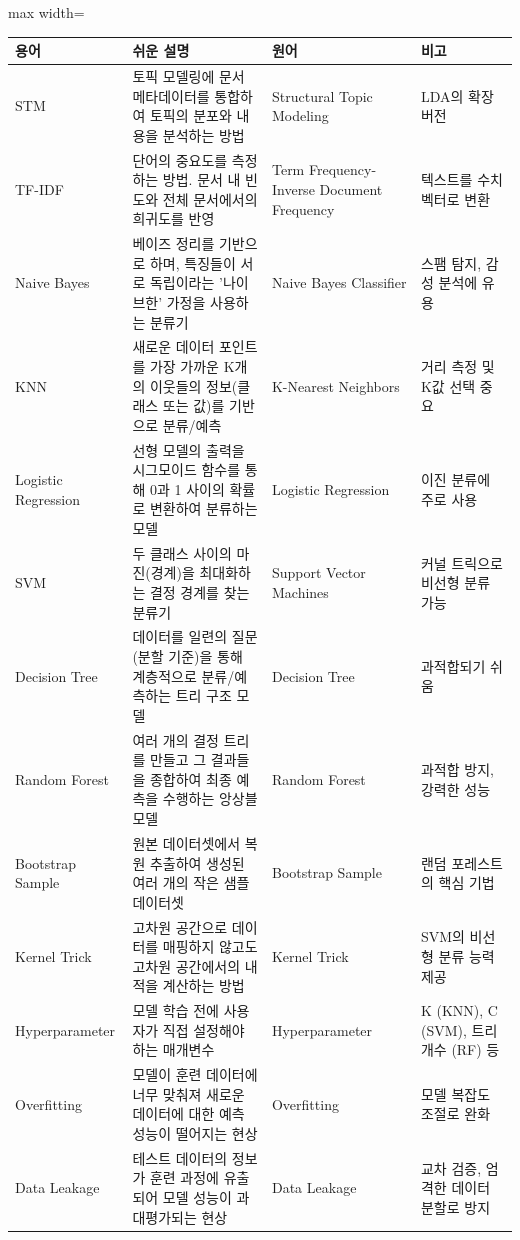 \documentclass[11pt,a4paper]{article}
\begin{document}
\begin{adjustbox}{max width=\textwidth}
\begin{tabular}{llll}
\toprule
\textbf{용어} & \textbf{쉬운 설명} & \textbf{원어} & \textbf{비고} \\
\midrule
STM & 토픽 모델링에 문서 메타데이터를 통합하여 토픽의 분포와 내용을 분석하는 방법 & Structural Topic Modeling & LDA의 확장 버전 \\
TF-IDF & 단어의 중요도를 측정하는 방법. 문서 내 빈도와 전체 문서에서의 희귀도를 반영 & Term Frequency-Inverse Document Frequency & 텍스트를 수치 벡터로 변환 \\
Naive Bayes & 베이즈 정리를 기반으로 하며, 특징들이 서로 독립이라는 '나이브한' 가정을 사용하는 분류기 & Naive Bayes Classifier & 스팸 탐지, 감성 분석에 유용 \\
KNN & 새로운 데이터 포인트를 가장 가까운 K개의 이웃들의 정보(클래스 또는 값)를 기반으로 분류/예측 & K-Nearest Neighbors & 거리 측정 및 K값 선택 중요 \\
Logistic Regression & 선형 모델의 출력을 시그모이드 함수를 통해 0과 1 사이의 확률로 변환하여 분류하는 모델 & Logistic Regression & 이진 분류에 주로 사용 \\
SVM & 두 클래스 사이의 마진(경계)을 최대화하는 결정 경계를 찾는 분류기 & Support Vector Machines & 커널 트릭으로 비선형 분류 가능 \\
Decision Tree & 데이터를 일련의 질문(분할 기준)을 통해 계층적으로 분류/예측하는 트리 구조 모델 & Decision Tree & 과적합되기 쉬움 \\
Random Forest & 여러 개의 결정 트리를 만들고 그 결과들을 종합하여 최종 예측을 수행하는 앙상블 모델 & Random Forest & 과적합 방지, 강력한 성능 \\
Bootstrap Sample & 원본 데이터셋에서 복원 추출하여 생성된 여러 개의 작은 샘플 데이터셋 & Bootstrap Sample & 랜덤 포레스트의 핵심 기법 \\
Kernel Trick & 고차원 공간으로 데이터를 매핑하지 않고도 고차원 공간에서의 내적을 계산하는 방법 & Kernel Trick & SVM의 비선형 분류 능력 제공 \\
Hyperparameter & 모델 학습 전에 사용자가 직접 설정해야 하는 매개변수 & Hyperparameter & K (KNN), C (SVM), 트리 개수 (RF) 등 \\
Overfitting & 모델이 훈련 데이터에 너무 맞춰져 새로운 데이터에 대한 예측 성능이 떨어지는 현상 & Overfitting & 모델 복잡도 조절로 완화 \\
Data Leakage & 테스트 데이터의 정보가 훈련 과정에 유출되어 모델 성능이 과대평가되는 현상 & Data Leakage & 교차 검증, 엄격한 데이터 분할로 방지 \\

\end{tabular}
\end{adjustbox}
\end{document}
